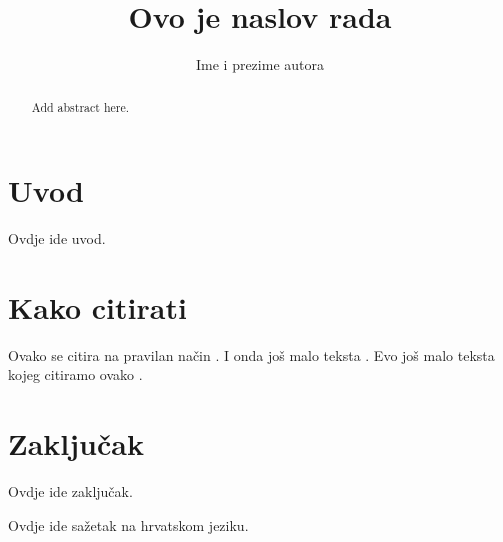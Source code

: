\documentclass[times, utf8, diplomski, numeric]{templates/template}
\begin{document}


\title{Ovo je naslov rada}


\author{Ime i prezime autora}

\maketitle

\izvornik


\tableofcontents

\chapter{Uvod}
Ovdje ide uvod.

\chapter{Kako citirati}
Ovako se citira na pravilan način \cite{oetiket2007lshort}. I onda još malo teksta \cite{downes2002shortams}. 
Evo još malo teksta kojeg citiramo ovako \cite{ungar2002uvod}.

\chapter{Zaključak}
Ovdje ide zaključak.




\begin{sazetak}
Ovdje ide sažetak na hrvatskom jeziku.

\end{sazetak}

\begin{abstract}
Add abstract here.

\end{abstract}
\end{document}

